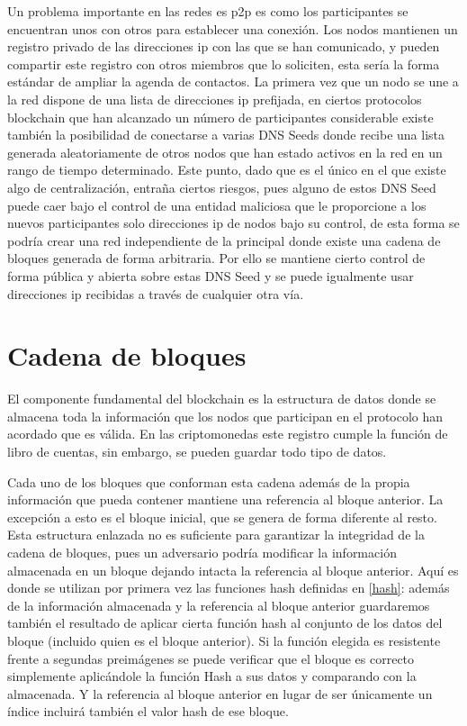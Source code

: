 Un problema importante en las redes es p2p es como los participantes se encuentran unos con otros para establecer una conexión. Los nodos mantienen un registro privado de las direcciones ip con las que se han comunicado, y pueden compartir este registro con otros miembros que lo soliciten, esta sería la forma estándar de ampliar la agenda de contactos. La primera vez que un nodo se une a la red dispone de una lista de direcciones ip prefijada, en ciertos protocolos blockchain que han alcanzado un número de participantes considerable existe también la posibilidad de conectarse a varias DNS Seeds donde recibe una lista generada aleatoriamente de otros nodos que han estado activos en la red en un rango de tiempo determinado. Este punto, dado que es el único en el que existe algo de centralización, entraña ciertos riesgos, pues alguno de estos DNS Seed puede caer bajo el control de una entidad maliciosa que le proporcione a los nuevos participantes solo direcciones ip de nodos bajo su control, de esta forma se podría crear una red independiente de la principal donde existe una cadena de bloques generada de forma arbitraria. Por ello se mantiene cierto control de forma pública y abierta sobre estas DNS Seed y se puede igualmente usar direcciones ip  recibidas a través de cualquier otra vía.


\section{Cadena de bloques}\label{bloques}
El componente fundamental del blockchain es la estructura de datos donde se almacena toda la información que los nodos que participan en el protocolo han acordado que es válida. En las criptomonedas este registro cumple la función de libro de cuentas, sin embargo, se pueden guardar todo tipo de datos.

Cada uno de los bloques que conforman esta cadena además de la propia información que pueda contener mantiene una referencia al bloque anterior. La excepción a esto es el bloque inicial, que se genera de forma diferente al resto.
Esta estructura enlazada no es suficiente para garantizar la integridad de la cadena de bloques, pues un adversario podría modificar la información almacenada en un bloque dejando intacta la referencia al bloque anterior. Aquí es donde se utilizan por primera vez las funciones hash definidas en \ref{hash}: además de la información almacenada y la referencia al bloque anterior guardaremos también el resultado de aplicar cierta función hash al conjunto de los datos del bloque (incluido quien es el bloque anterior). Si la función elegida es resistente frente a segundas preimágenes se puede verificar que  el bloque es correcto simplemente aplicándole la función Hash a sus datos y comparando con la almacenada. Y la referencia al bloque anterior en lugar de ser únicamente un índice incluirá también el valor hash de ese bloque.

